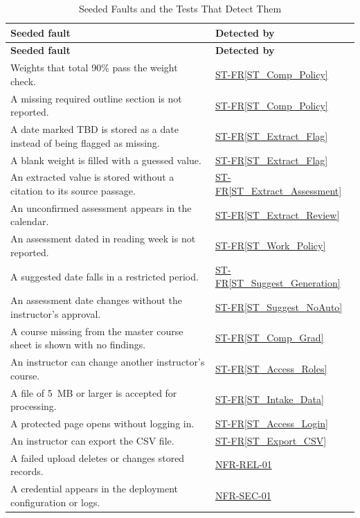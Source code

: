 \documentclass[12pt, titlepage]{article}
\newcommand{\stref}[1]{\hyperref[#1]{ST-FR\ref*{#1}}}
\newcommand{\nfrref}[1]{\hyperref[#1]{#1}}
\begin{document}
{\small
\renewcommand{\arraystretch}{1.2}
\begin{longtable}{>{\raggedright\arraybackslash}p{}
  >{\raggedright\arraybackslash}p{}}
\caption{Seeded Faults and the Tests That Detect Them}
\label{tab:SeededFaults}\\
\toprule
\textbf{Seeded fault} & \textbf{Detected by}\\
\midrule
\endfirsthead
\toprule
\textbf{Seeded fault} & \textbf{Detected by}\\
\midrule
\endhead
\bottomrule
\endfoot
Weights that total 90\% pass the weight check. & \stref{ST_Comp_Policy}\\
A missing required outline section is not reported. & \stref{ST_Comp_Policy}\\
A date marked TBD is stored as a date instead of being flagged as missing. & \stref{ST_Extract_Flag}\\
A blank weight is filled with a guessed value. & \stref{ST_Extract_Flag}\\
An extracted value is stored without a citation to its source passage. & \stref{ST_Extract_Assessment}\\
An unconfirmed assessment appears in the calendar. & \stref{ST_Extract_Review}\\
An assessment dated in reading week is not reported. & \stref{ST_Work_Policy}\\
A suggested date falls in a restricted period. & \stref{ST_Suggest_Generation}\\
An assessment date changes without the instructor's approval. & \stref{ST_Suggest_NoAuto}\\
A course missing from the master course sheet is shown with no findings. & \stref{ST_Comp_Grad}\\
An instructor can change another instructor's course. & \stref{ST_Access_Roles}\\
A file of 5~MB or larger is accepted for processing. & \stref{ST_Intake_Data}\\
A protected page opens without logging in. & \stref{ST_Access_Login}\\
An instructor can export the CSV file. & \stref{ST_Export_CSV}\\
A failed upload deletes or changes stored records. & \nfrref{NFR-REL-01}\\
A credential appears in the deployment configuration or logs. & \nfrref{NFR-SEC-01}\\
\end{longtable}
}
\end{document}
